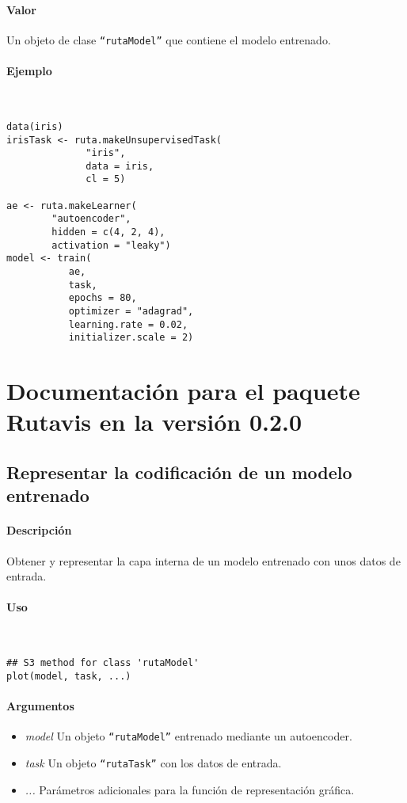 \paragraph{Valor}
Un objeto de clase \texttt{``rutaModel''} que contiene el modelo entrenado.

\paragraph{Ejemplo}
~

\begin{lstlisting}
data(iris)
irisTask <- ruta.makeUnsupervisedTask(
              "iris",
              data = iris,
              cl = 5)

ae <- ruta.makeLearner(
        "autoencoder",
        hidden = c(4, 2, 4),
        activation = "leaky")
model <- train(
           ae,
           task,
           epochs = 80,
           optimizer = "adagrad",
           learning.rate = 0.02,
           initializer.scale = 2)         
\end{lstlisting}

\section{Documentación para el paquete Rutavis en la versión 0.2.0}

\subsection{Representar la codificación de un modelo entrenado}

\paragraph{Descripción}
Obtener y representar la capa interna de un modelo entrenado con unos datos de entrada.

\paragraph{Uso}
~

\begin{lstlisting}
## S3 method for class 'rutaModel'
plot(model, task, ...)
\end{lstlisting}

\paragraph{Argumentos}
\begin{itemize}
\item \emph{model}	Un objeto \texttt{``rutaModel''} entrenado mediante un autoencoder.
\item \emph{task}	Un objeto \texttt{``rutaTask''} con los datos de entrada.
\item \emph{...}	Parámetros adicionales para la función de representación gráfica.
\end{itemize}

